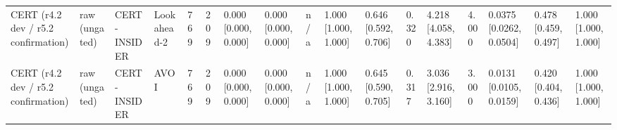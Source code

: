 \begin{table}[!ht]
{\begin{tabular}{lllllllllllllllll}
CERT (r4.2 dev / r5.2 confirmation) & raw (ungated) & CERT-INSIDER & Lookahead-2 & 769 & 209 & 0.000 [0.000, 0.000] & 0.000 [0.000, 0.000] & n/a & 1.000 [1.000, 1.000] & 0.646 [0.592, 0.706] & 0.320 & 4.218 [4.058, 4.383] & 4.000 & 0.0375 [0.0262, 0.0504] & 0.478 [0.459, 0.497] & 1.000 [1.000, 1.000] \\
CERT (r4.2 dev / r5.2 confirmation) & raw (ungated) & CERT-INSIDER & AVOI & 769 & 209 & 0.000 [0.000, 0.000] & 0.000 [0.000, 0.000] & n/a & 1.000 [1.000, 1.000] & 0.645 [0.590, 0.705] & 0.317 & 3.036 [2.916, 3.160] & 3.000 & 0.0131 [0.0105, 0.0159] & 0.420 [0.404, 0.436] & 1.000 [1.000, 1.000] \\
\bottomrule
\end{tabular}}
\end{table}
